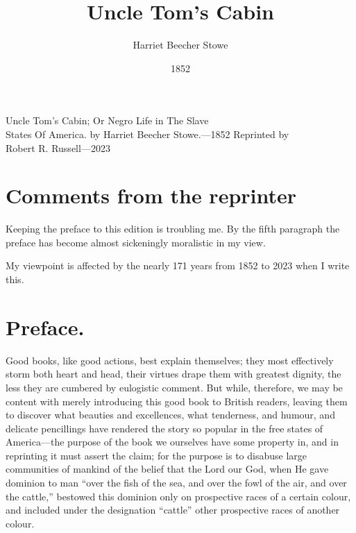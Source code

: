 \title{Uncle Tom's Cabin}
\author{Harriet Beecher Stowe}
\date{1852}
\begin{titlepage}
    \begin{center}
        \vspace*{1in}
        {\Huge Uncle Tom's Cabin;}
        {\large Or Negro Life in The Slave\\ States Of America.}
        \vspace{1in}
        {\large by}
        {\huge Harriet Beecher Stowe.---1852}
        \vfill
        {\large Reprinted by\\ Robert R. Russell---2023}
    \end{center}
\end{titlepage}

\chapter{Comments from the reprinter}

Keeping the preface to this edition is troubling me. By the fifth paragraph the
preface has become almost sickeningly moralistic in my view.

My viewpoint is affected by the nearly 171 years from 1852 to 2023 when I write
this. 

\chapter{Preface.}

Good books, like good actions, best explain themselves; they most effectively
storm both heart and head, their virtues drape them with greatest dignity, the
less they are cumbered by eulogistic comment. But while, therefore, we may be
content with merely introducing this good book to British readers, leaving them
to discover what beauties and excellences, what tenderness, and humour, and
delicate pencillings have rendered the story so popular in the free states of
America---the purpose of the book we ourselves have some property in, and in
reprinting it must assert the claim; for the purpose is to disabuse large
communities of mankind of the belief that the Lord our God, when He gave
dominion to man ``over the fish of the sea, and over the fowl of the air, and
over the cattle,'' bestowed this dominion only on prospective races of a certain
colour, and included under the designation ``cattle'' other prospective races of
another colour.

